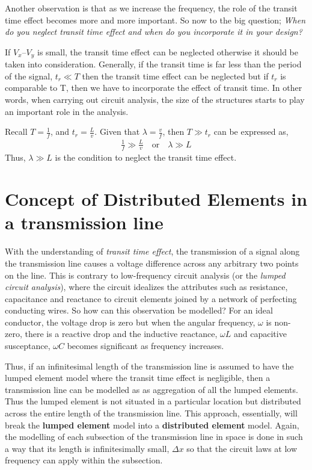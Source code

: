 Another observation is that as we increase the frequency, the role of the transit time effect becomes more and more important. So now to the big question; \textit{When do you neglect transit time effect and when do you incorporate it in your design?}

If $ V_{x} – V_{y} $ is small, the transit time effect can be neglected otherwise it should be taken into consideration. Generally, if the transit time is far less than the period of the signal,  $ t_{r} \ll T $ then the transit time effect can be neglected but if $ t_{r} $ is comparable to T, then we have to incorporate the effect of transit time. In other words, when carrying out circuit analysis, the size of the structures starts to play an important role in the analysis.

Recall $T = \frac{1}{f} $, and $t_{r} = \frac{L}{v}$. Given that $ \lambda = \frac{v}{f} $, then $T \gg t_r$ can be expressed as, 
\begin{align*}
\frac{1}{f} \gg \frac{L}{v}\quad\text{or}\quad\lambda \gg L
\end{align*}
Thus, $ \lambda \gg L $ is the condition to neglect the transit time effect.

\section{Concept of Distributed Elements in a transmission line}
With the understanding of \textit{transit time effect}, the transmission of a signal along the transmission line causes a voltage difference across any arbitrary two points on the line. This is contrary to low-frequency circuit analysis (or the \textit{lumped circuit analysis}), where the circuit idealizes the attributes such as resistance, capacitance and reactance to circuit elements joined by a network of perfecting conducting wires. So how can this observation be modelled? For an ideal conductor, the voltage drop is zero but when the angular frequency, $\omega$ is non-zero, there is a reactive drop and the inductive reactance, $\omega L$ and capacitive susceptance, $\omega C$ becomes significant as frequency increases.

Thus, if an infinitesimal length of the transmission line is assumed to have the lumped element model where the transit time effect is negligible, then a transmission line can be modelled as as aggregation of all the lumped elements. Thus the lumped element is not situated in a particular location but distributed across the entire length of the transmission line. This approach, essentially, will break the \textbf{lumped element} model into a \textbf{distributed element} model. Again, the modelling of each subsection of the transmission line in space is done in such a way that its length is infinitesimally small, $\Delta x$ so that the circuit laws at low frequency can apply within the subsection.


